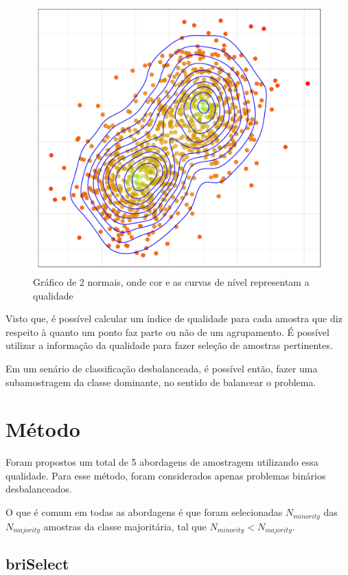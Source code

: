\documentclass[]{article}
\begin{document}
	\begin{figure}[H]
		\includegraphics[width=\linewidth]{imgs/qualidade_plot.png}
		\caption{Gráfico de 2 normais, onde cor e as curvas de nível representam a qualidade}
		\label{fig:qplot}
	\end{figure}
	
	Visto que, é possível calcular um índice de qualidade para cada amostra que diz respeito à quanto um ponto faz parte ou não de um agrupamento. É possível utilizar a informação da qualidade para fazer seleção de amostras pertinentes.
	
	Em um senário de classificação desbalanceada, é possível então, fazer uma subamostragem da classe dominante, no sentido de balancear o problema. 
	
	\section{Método}
	Foram propostos um total de 5 abordagens de amostragem utilizando essa qualidade. Para esse método, foram considerados apenas problemas binários desbalanceados. 
	
	O que é comum em todas as abordagens é que foram selecionadas $N_{minority}$ das $N_{majority}$ amostras da classe majoritária, tal que $N_{minority} < N_{majority}$.
	
	\subsection{briSelect} 
	
\end{document}
